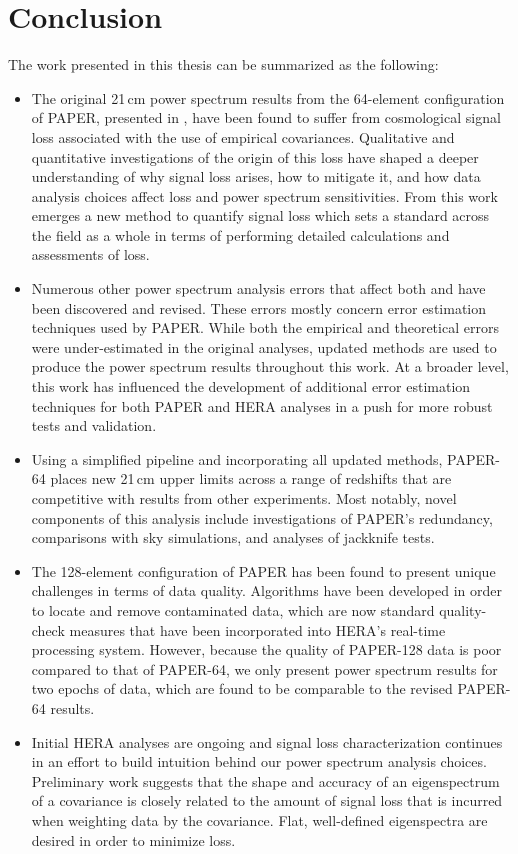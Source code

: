 
\chapter{Conclusion}
\label{c.conclusion}

The work presented in this thesis can be summarized as the following:

\begin{itemize}
\item The original 21\,cm power spectrum results from the 64-element configuration of PAPER, presented in , have been found to suffer from cosmological signal loss associated with the use of empirical covariances. Qualitative and quantitative investigations of the origin of this loss have shaped a deeper understanding of why signal loss arises, how to mitigate it, and how data analysis choices affect loss and power spectrum sensitivities. From this work emerges a new method to quantify signal loss which sets a standard across the field as a whole in terms of performing detailed calculations and assessments of loss.
\item Numerous other power spectrum analysis errors that affect both \citet{parsons_et_al2014} and  have been discovered and revised. These errors mostly concern error estimation techniques used by PAPER. While both the empirical and theoretical errors were under-estimated in the original analyses, updated methods are used to produce the power spectrum results throughout this work. At a broader level, this work has influenced the development of additional error estimation techniques for both PAPER and HERA analyses in a push for more robust tests and validation.
\item Using a simplified pipeline and incorporating all updated methods, PAPER-64 places new 21\,cm upper limits across a range of redshifts that are competitive with results from other experiments. Most notably, novel components of this analysis include investigations of PAPER's redundancy, comparisons with sky simulations, and analyses of jackknife tests.
\item The 128-element configuration of PAPER has been found to present unique challenges in terms of data quality. Algorithms have been developed in order to locate and remove contaminated data, which are now standard quality-check measures that have been incorporated into HERA's real-time processing system. However, because the quality of PAPER-128 data is poor compared to that of PAPER-64, we only present power spectrum results for two epochs of data, which are found to be comparable to the revised PAPER-64 results.
\item Initial HERA analyses are ongoing and signal loss characterization continues in an effort to build intuition behind our power spectrum analysis choices. Preliminary work suggests that the shape and accuracy of an eigenspectrum of a covariance is closely related to the amount of signal loss that is incurred when weighting data by the covariance. Flat, well-defined eigenspectra are desired in order to minimize loss.
\end{itemize}

